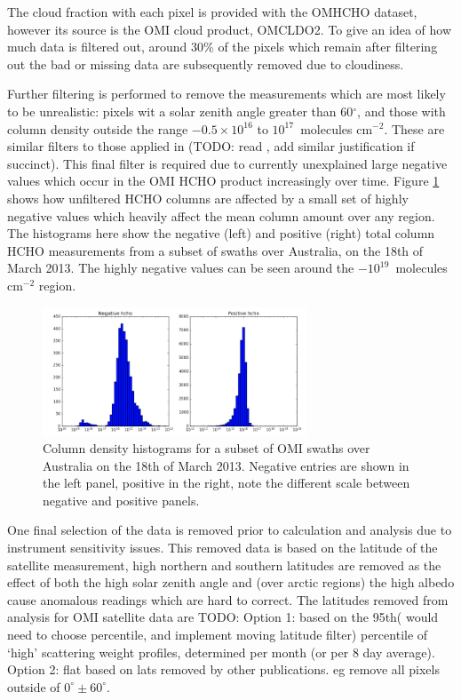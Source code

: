     The cloud fraction with each pixel is provided with the OMHCHO dataset, however its source is the OMI cloud product, OMCLDO2.
    To give an idea of how much data is filtered out, around 30\% of the pixels which remain after filtering out the bad or missing data are subsequently removed due to cloudiness.
    
    Further filtering is performed to remove the measurements which are most likely to be unrealistic: pixels wit a solar zenith angle greater than 60$^\circ$, and those with column density outside the range $-0.5 \times 10^{16}$ to $10^{17} $~molecules cm$^{-2}$.
    These are similar filters to those applied in (TODO: read \citet{Zhu2016}, add similar justification if succinct).
    This final filter is required due to currently unexplained large negative values which occur in the OMI HCHO product increasingly over time.
    Figure \ref{ch_isop:fig:OMI_negative_hist} shows how unfiltered HCHO columns are affected by a small set of highly negative values which heavily affect the mean column amount over any region.
    The histograms here show the negative (left) and positive (right) total column HCHO measurements from a subset of swaths over Australia, on the 18th of March 2013.
    The highly negative values can be seen around the $-10^{19}$~molecules cm$^{-2}$ region.
    
    \begin{figure}[!htbp]\begin{center}
      \includegraphics[width=0.7\textwidth]{Figures/AusOMHCHO_Hist_20130318.png}
      \caption{Column density histograms for a subset of OMI swaths over Australia on the 18th of March 2013.
      Negative entries are shown in the left panel, positive in the right, note the different scale between negative and positive panels.}
      \label{ch_isop:fig:OMI_negative_hist}
    \end{center}\end{figure}
    
    One final selection of the data is removed prior to calculation and analysis due to instrument sensitivity issues.
    This removed data is based on the latitude of the satellite measurement, high northern and southern latitudes are removed as the effect of both the high solar zenith angle and (over arctic regions) the high albedo cause anomalous readings which are hard to correct.
    The latitudes removed from analysis for OMI satellite data are TODO:
    Option 1: based on the 95th( would need to choose percentile, and implement moving latitude filter) percentile of `high' scattering weight profiles, determined per month (or per 8 day average).
    Option 2: flat based on lats removed by other publications. eg remove all pixels outside of $0^\circ \pm 60^\circ$.
  
